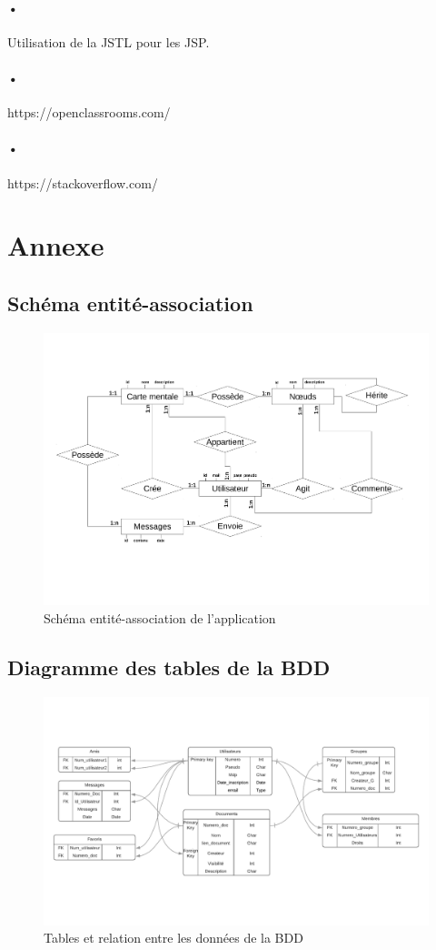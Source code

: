 \documentclass[11pt,a4paper]{article}
\begin{document}
\paragraph{•} Utilisation de la JSTL pour les JSP.
\paragraph{•} https://openclassrooms.com/
\paragraph{•} https://stackoverflow.com/

\newpage
\section{Annexe}
\subsection{Schéma entité-association}
\begin{figure}[!h]
\includegraphics[angle=270, scale=0.6]{Image/Schema_entite_association.pdf}
\caption{Schéma entité-association de l'application}
\end{figure}
\newpage
\subsection{Diagramme des tables de la BDD}
\begin{figure}[!h]
\centering
\includegraphics[angle=270, scale=0.7]{Image/Diagramme_BDD.pdf}
\caption{Tables et relation entre les données de la BDD}
\end{figure}
\newpage
\end{document}

